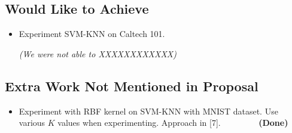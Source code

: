 \documentclass[11pt,letterpaper]{article}
\begin{document}
\subsection{Would Like to Achieve}
\begin{itemize}
\item Experiment SVM-KNN on Caltech 101. 

\textit{(We were not able to XXXXXXXXXXXX)}
\end{itemize}

\subsection{Extra Work Not Mentioned in Proposal}

\begin{itemize}
\item Experiment with RBF kernel on SVM-KNN with MNIST dataset. Use various $K$ values when experimenting. Approach in [7]. $\>\>\>\>\>\>\>\>\>\>\>\>\>\>\>\>\>\>\>$\textbf{(Done)}

\end{itemize}
\end{document}
